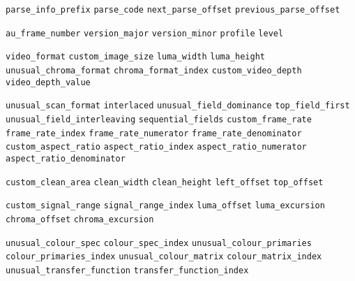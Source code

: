 
\newcommand{\fdefine}[2]{%
    \label{#1}%
    \expandafter\def\csname #1\endcsname{{#2}}}

\newcommand{\pdefine}[2]{%
    \label{#1}%
    \expandafter\def\csname #1\endcsname{{\texttt{#2}}}}


\pdefine{ParseInfoPrefix}{parse\_info\_prefix}
\pdefine{ParseCode}{parse\_code}
\pdefine{NextParseOffset}{next\_parse\_offset}
\pdefine{PrevParseOffset}{previous\_parse\_offset}

\pdefine{AUFrameNumber}{au\_frame\_number}
\pdefine{VersionMajor}{version\_major}
\pdefine{VersionMinor}{version\_minor}
\pdefine{Profile}{profile}
\pdefine{Level}{level}

\pdefine{VideoFormat}{video\_format}
\pdefine{CustomImageSize}{custom\_image\_size}
\pdefine{LumaWidth}{luma\_width}
\pdefine{LumaHeight}{luma\_height}
\pdefine{UnusualChromaFormat}{unusual\_chroma\_format}
\pdefine{ChromaFormatIndex}{chroma\_format\_index}
\pdefine{CustomVideoDepth}{custom\_video\_depth}
\pdefine{VideoDepthValue}{video\_depth\_value}

\pdefine{UnusualScanFormat}{unusual\_scan\_format}
\pdefine{Interlaced}{interlaced}
\pdefine{UnusualFieldDominance}{unusual\_field\_dominance}
\pdefine{TopFieldFirst}{top\_field\_first}
\pdefine{UnusualFieldInterleaving}{unusual\_field\_interleaving}
\pdefine{SequentialFields}{sequential\_fields}
\pdefine{CustomFrameRate}{custom\_frame\_rate}
\pdefine{FrameRateIndex}{frame\_rate\_index}
\pdefine{FrameRateNumerator}{frame\_rate\_numerator}
\pdefine{FrameRateDenominator}{frame\_rate\_denominator}
\pdefine{CustomAspectRatio}{custom\_aspect\_ratio}
\pdefine{AspectRatioIndex}{aspect\_ratio\_index}
\pdefine{AspectRatioNumerator}{aspect\_ratio\_numerator}
\pdefine{AspectRatioDenominator}{aspect\_ratio\_denominator}

\pdefine{CustomCleanArea}{custom\_clean\_area}
\pdefine{CleanWidth}{clean\_width}
\pdefine{CleanHeight}{clean\_height}
\pdefine{LeftOffset}{left\_offset}
\pdefine{TopOffset}{top\_offset}

\pdefine{CustomSignalRange}{custom\_signal\_range}
\pdefine{SignalRangeIndex}{signal\_range\_index}
\pdefine{LumaOffset}{luma\_offset}
\pdefine{LumaExcursion}{luma\_excursion}
\pdefine{ChromaOffset}{chroma\_offset}
\pdefine{ChromaExcursion}{chroma\_excursion}

\pdefine{UnusualColourSpec}{unusual\_colour\_spec}
\pdefine{ColourSpecIndex}{colour\_spec\_index}
\pdefine{UnusualColourPrimaries}{unusual\_colour\_primaries}
\pdefine{ColourPrimariesIndex}{colour\_primaries\_index}
\pdefine{UnusualColourMatrix}{unusual\_colour\_matrix}
\pdefine{ColourMatrixIndex}{colour\_matrix\_index}
\pdefine{UnusualTransferFunction}{unusual\_transfer\_function}
\pdefine{TransferFunctionIndex}{transfer\_function\_index}

